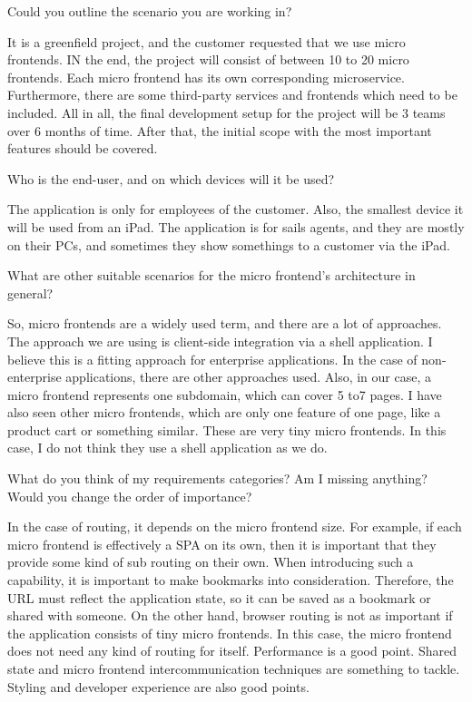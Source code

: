 \begin{description}
    \NicoVogel Could you outline the scenario you are working in?

    \PirminRehm It is a greenfield project, and the customer requested that we use micro frontends. IN the end, the project will consist of between 10 to 20 micro frontends. Each micro frontend has its own corresponding microservice. Furthermore, there are some third-party services and frontends which need to be included. All in all, the final development setup for the project will be 3 teams over 6 months of time. After that, the initial scope with the most important features should be covered.

    \NicoVogel Who is the end-user, and on which devices will it be used?

    \PirminRehm The application is only for employees of the customer. Also, the smallest device it will be used from an iPad. The application is for sails agents, and they are mostly on their PCs, and sometimes they show somethings to a customer via the iPad.

    \NicoVogel What are other suitable scenarios for the micro frontend's architecture in general?

    \PirminRehm So, micro frontends are a widely used term, and there are a lot of approaches. The approach we are using is client-side integration via a shell application. I believe this is a fitting approach for enterprise applications. In the case of non-enterprise applications, there are other approaches used. Also, in our case, a micro frontend represents one subdomain, which can cover 5 to7 pages. I have also seen other micro frontends, which are only one feature of one page, like a product cart or something similar. These are very tiny micro frontends. In this case, I do not think they use a shell application as we do.

    \NicoVogel What do you think of my requirements categories? Am I missing anything? Would you change the order of importance?

    \PirminRehm In the case of routing, it depends on the micro frontend size. For example, if each micro frontend is effectively a SPA on its own, then it is important that they provide some kind of sub routing on their own. When introducing such a capability, it is important to make bookmarks into consideration. Therefore, the URL must reflect the application state, so it can be saved as a bookmark or shared with someone. On the other hand, browser routing is not as important if the application consists of tiny micro frontends. In this case, the micro frontend does not need any kind of routing for itself. Performance is a good point. Shared state and micro frontend intercommunication techniques are something to tackle. Styling and developer experience are also good points.


\end{description}
